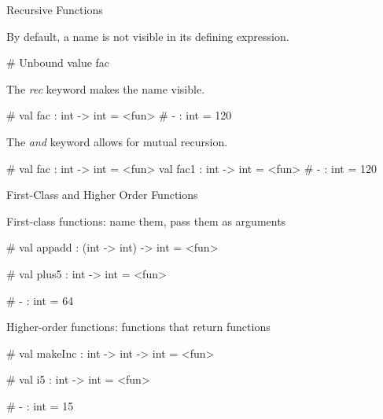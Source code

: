\documentclass{plt}
\begin{document}
\begin{frame}[fragile]{Recursive Functions}

By default, a name is not visible in its defining expression.

\begin{interactive}
# 
Unbound value fac
\end{interactive}

The \emph{rec} keyword makes the name visible.

\begin{interactive}
# 
val fac : int -> int = <fun>
# 
- : int = 120
\end{interactive}

The \emph{and} keyword allows for mutual recursion.

\begin{interactive}
# 
val fac : int -> int = <fun>
val fac1 : int -> int = <fun>
# 
- : int = 120
\end{interactive}

\end{frame}


\begin{frame}[fragile]{First-Class and Higher Order Functions}

  First-class functions: name them, pass them as arguments

\begin{interactive}
# 
val appadd : (int -> int) -> int = <fun>
  
# 
val plus5 : int -> int = <fun>

# 
- : int = 64
\end{interactive}

Higher-order functions: functions that return functions

\begin{interactive}
# 
val makeInc : int -> int -> int = <fun>

# 
val i5 : int -> int = <fun>

# 
- : int = 15 
\end{interactive}

\end{frame}
\end{document}
